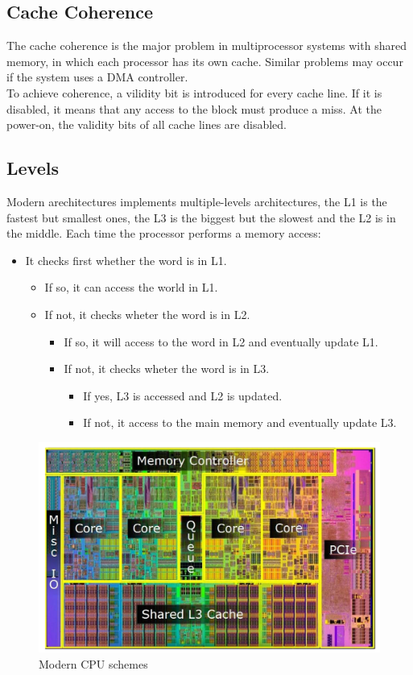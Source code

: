 \documentclass[12pt]{article}
\begin{document}
\subsection{Cache Coherence}
The cache coherence is the major problem in multiprocessor systems with shared memory, in which each processor has its own cache. Similar problems may occur if the system uses a DMA controller.\\
To achieve coherence, a vilidity bit is introduced for every cache line. If it is disabled, it means that any access to the block must produce a miss. At the power-on, the validity bits of all cache lines are disabled.

\subsection{Levels}
Modern arechitectures implements multiple-levels architectures, the L1 is the fastest but smallest ones, the L3 is the biggest but the slowest and the L2 is in the middle. Each time the processor performs a memory access:
\begin{itemize}
  \item It checks first whether the word is in L1.
  \begin{itemize}
    \item If so, it can access the world in L1.
    \item If not, it checks wheter the word is in L2.
    \begin{itemize}
      \item If so, it will access to the word in L2 and eventually update L1.
      \item If not, it checks wheter the word is in L3.
      \begin{itemize}
        \item If yes, L3 is accessed and L2 is updated.
        \item If not, it access to the main memory and eventually update L3.
      \end{itemize}
    \end{itemize}
  \end{itemize}
\end{itemize}
\begin{figure}[h!]
  \includegraphics[width=\linewidth]{images/intel.png}
  \caption{Modern CPU schemes}
  \label{fig:intel}
\end{figure}
\end{document}

